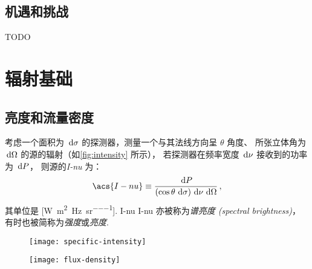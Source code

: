 \subsection{机遇和挑战}

TODO


\section{辐射基础}
\label{sec:radiation}

\subsection{亮度和流量密度}

考虑一个面积为 $\,\mathrm{d}\sigma$ 的探测器，测量一个与其法线方向呈 $\theta$ 角度、
所张立体角为 $\,\mathrm{d}\Omega$ 的源的辐射（如\autoref{fig:intensity} 所示），
若探测器在频率宽度 $\,\mathrm{d}\nu$ 接收到的功率为 $\,\mathrm{d}P$，
则源的\emph{\acf{I-nu}} 为：
\begin{equation}
  \label{eq:intensity}
  \acs{I-nu} \equiv
    \frac{\D{P}}{(\cos\theta\,\D{\sigma}) \,\D{\nu} \,\D{\Omega}} \,,
\end{equation}
其单位是 [\si{\watt\per\square\meter\per\hertz\per\steradian}].
\acl{I-nu} \acs{I-nu} 亦被称为\emph{谱亮度 (spectral brightness)}，
有时也被简称为\emph{强度}或\emph{亮度}.

\begin{figure}
  \centering
  \texttt{[image: specific-intensity]}
  \label{fig:intensity}
\end{figure}

\begin{figure}
  \centering
  \texttt{[image: flux-density]}
  \label{fig:flux-density}
\end{figure}


